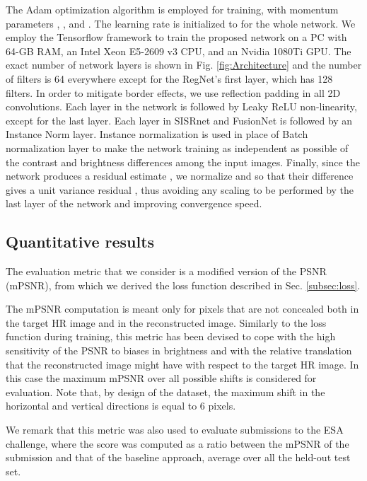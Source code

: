 \documentclass[journal]{IEEEtran}
\begin{document}
The Adam optimization algorithm \cite{kingma2014adam} is employed for training, with momentum parameters , , and . The learning rate  is initialized to  for the whole network. 
We employ the Tensorflow framework to train the proposed network on a PC with 64-GB RAM, an Intel Xeon E5-2609 v3 CPU, and an Nvidia 1080Ti GPU.
The exact number of network layers is shown in Fig. \ref{fig:Architecture} and the number of filters is 64 everywhere except for the RegNet's first layer, which has 128 filters. In order to mitigate border effects, we use reflection padding in all 2D convolutions.
Each layer in the network is followed by Leaky ReLU non-linearity, except for the last layer. Each layer in SISRnet and FusionNet is followed by an Instance Norm layer.
Instance normalization \cite{vedaldi2016instance} is used in place of Batch normalization layer to make the network training as independent as possible of the contrast and brightness differences among the input images.
Finally, since the network produces a residual estimate , we normalize  and  so that their difference gives a unit variance residual , thus avoiding any scaling to be performed by the last layer of the network and improving convergence speed.



\subsection{Quantitative results}


The evaluation metric that we consider is a modified version of the PSNR (mPSNR), from which we derived the loss function described in Sec. \ref{subsec:loss}.

The mPSNR computation is meant only for pixels that are not concealed both in the target HR image and in the reconstructed image. Similarly to the loss function during training, this metric has been devised to cope with the high sensitivity of the PSNR to biases in brightness and with the relative translation that the reconstructed image might have with respect to the target HR image. In this case the maximum mPSNR over all possible shifts is considered for evaluation. Note that, by design of the dataset, the maximum shift in the horizontal and vertical directions is equal to 6 pixels.

We remark that this metric was also used to evaluate submissions to the ESA challenge, where the score was computed as a ratio between the mPSNR of the submission and that of the baseline approach, average over all the held-out test set.
\end{document}
